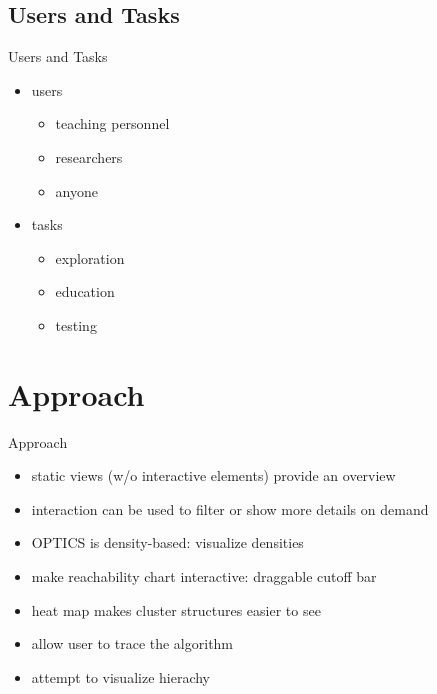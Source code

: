 \documentclass[naustrian]{beamer}
\begin{document}
\subsection{Users and Tasks}

\begin{frame}{Users and Tasks}
    \begin{itemize}
        \item users
            \begin{itemize}
                \item teaching personnel
                \item researchers
                \item anyone
            \end{itemize}
        \item tasks
            \begin{itemize}
                \item exploration
                \item education
                \item testing
            \end{itemize}
    \end{itemize}
\end{frame}

\section{Approach}

\begin{frame}{Approach}
    \begin{itemize}
        \item static views (w/o interactive elements) provide an overview
        \item interaction can be used to filter or show more details on demand
        \item OPTICS is density-based: visualize densities
        \item make reachability chart interactive: draggable cutoff bar
        \item heat map makes cluster structures easier to see
        \item allow user to trace the algorithm
        \item attempt to visualize hierachy
    \end{itemize}
\end{frame}
\end{document}
